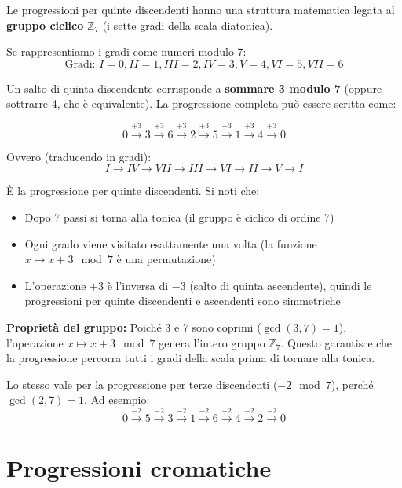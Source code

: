 \begin{matematica}
	Le progressioni per quinte discendenti hanno una struttura matematica legata al \textbf{gruppo ciclico} $\mathbb{Z}_7$ (i sette gradi della scala diatonica).
	
	Se rappresentiamo i gradi come numeri modulo 7:
	\[
	\text{Gradi: } I=0, II=1, III=2, IV=3, V=4, VI=5, VII=6
	\]
	
	Un salto di quinta discendente corrisponde a \textbf{sommare 3 modulo 7} (oppure sottrarre 4, che è equivalente). La progressione completa può essere scritta come:
	
	\[
	0 \xrightarrow{+3} 3 \xrightarrow{+3} 6 \xrightarrow{+3} 2 \xrightarrow{+3} 5 \xrightarrow{+3} 1 \xrightarrow{+3} 4 \xrightarrow{+3} 0
	\]
	
	Ovvero (traducendo in gradi):
	\[
	I \rightarrow IV \rightarrow VII \rightarrow III \rightarrow VI \rightarrow II \rightarrow V \rightarrow I
	\]
	
	È la progressione per quinte discendenti. Si noti che:
	\begin{itemize}
		\item Dopo 7 passi si torna alla tonica (il gruppo è ciclico di ordine 7)
		\item Ogni grado viene visitato esattamente una volta (la funzione $x \mapsto x+3 \mod 7$ è una permutazione)
		\item L'operazione $+3$ è l'inversa di $-3$ (salto di quinta ascendente), quindi le progressioni per quinte discendenti e ascendenti sono simmetriche
	\end{itemize}
	
	\textbf{Proprietà del gruppo:} Poiché 3 e 7 sono coprimi ($\gcd(3,7) = 1$), l'operazione $x \mapsto x+3 \mod 7$ genera l'intero gruppo $\mathbb{Z}_7$. Questo garantisce che la progressione percorra tutti i gradi della scala prima di tornare alla tonica.
	
	Lo stesso vale per la progressione per terze discendenti ($-2 \mod 7$), perché $\gcd(2,7) = 1$. Ad esempio:
	\[
	0 \xrightarrow{-2} 5 \xrightarrow{-2} 3 \xrightarrow{-2} 1 \xrightarrow{-2} 6 \xrightarrow{-2} 4 \xrightarrow{-2} 2 \xrightarrow{-2} 0
	\]
	
\end{matematica}

\section{Progressioni cromatiche}
\label{sec:progressioni_cromatiche}

